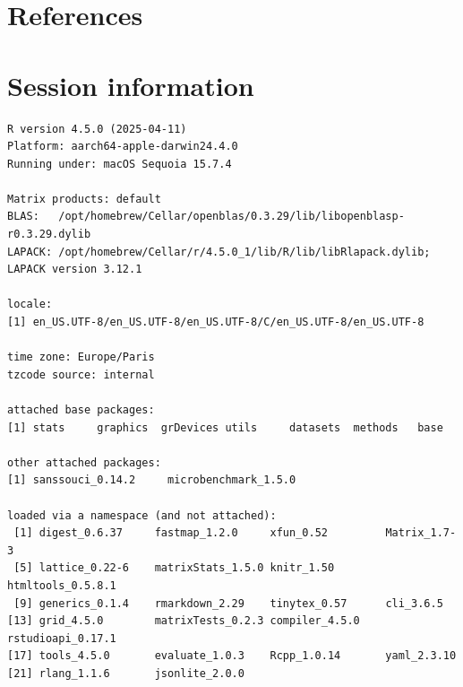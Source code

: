 \documentclass[
  11pt,
  a4paper,
]{article}
\theoremstyle{plain}
\theoremstyle{plain}
\theoremstyle{definition}
\theoremstyle{plain}
\theoremstyle{definition}
\theoremstyle{remark}
\begin{document}
\section*{References}\label{references}

\renewcommand{\bibsection}{}


\section*{Session information}\label{session-information}

\begin{verbatim}
R version 4.5.0 (2025-04-11)
Platform: aarch64-apple-darwin24.4.0
Running under: macOS Sequoia 15.7.4

Matrix products: default
BLAS:   /opt/homebrew/Cellar/openblas/0.3.29/lib/libopenblasp-r0.3.29.dylib 
LAPACK: /opt/homebrew/Cellar/r/4.5.0_1/lib/R/lib/libRlapack.dylib;  LAPACK version 3.12.1

locale:
[1] en_US.UTF-8/en_US.UTF-8/en_US.UTF-8/C/en_US.UTF-8/en_US.UTF-8

time zone: Europe/Paris
tzcode source: internal

attached base packages:
[1] stats     graphics  grDevices utils     datasets  methods   base     

other attached packages:
[1] sanssouci_0.14.2     microbenchmark_1.5.0

loaded via a namespace (and not attached):
 [1] digest_0.6.37     fastmap_1.2.0     xfun_0.52         Matrix_1.7-3     
 [5] lattice_0.22-6    matrixStats_1.5.0 knitr_1.50        htmltools_0.5.8.1
 [9] generics_0.1.4    rmarkdown_2.29    tinytex_0.57      cli_3.6.5        
[13] grid_4.5.0        matrixTests_0.2.3 compiler_4.5.0    rstudioapi_0.17.1
[17] tools_4.5.0       evaluate_1.0.3    Rcpp_1.0.14       yaml_2.3.10      
[21] rlang_1.1.6       jsonlite_2.0.0   
\end{verbatim}
\end{document}
